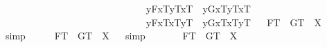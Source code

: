 \begin{isabellebody}
\ \ \ \ \ \ \ \ \ \ \ \ \ \ \ \ \ \ \ \ \ \ \ \ \ \ \ \ \ \isactrlbold {\isasymand}\ {\isacharparenleft}\isactrlbold {\isasymlambda}y{\isachardot}{\isasymlparr}F{}{\isacharcomma}x{}\isactrlsup T{\isacharcomma}y\isactrlsup T{\isacharcomma}x{}\isactrlsup T{\isasymrparr}{\isacharparenright}\ \isactrlbold {\isacharequal}\ {\isacharparenleft}\isactrlbold {\isasymlambda}y{\isachardot}{\isasymlparr}G{}{\isacharcomma}x{}\isactrlsup T{\isacharcomma}y\isactrlsup T{\isacharcomma}x{}\isactrlsup T{\isasymrparr}{\isacharparenright}\isanewline
\ \ \ \ \ \ \ \ \ \ \ \ \ \ \ \ \ \ \ \ \ \ \ \ \ \ \ \ \ \isactrlbold {\isasymand}\ {\isacharparenleft}\isactrlbold {\isasymlambda}y{\isachardot}{\isasymlparr}F{}{\isacharcomma}x{}\isactrlsup T{\isacharcomma}x{}\isactrlsup T{\isacharcomma}y\isactrlsup T{\isasymrparr}{\isacharparenright}\ \isactrlbold {\isacharequal}\ {\isacharparenleft}\isactrlbold {\isasymlambda}y{\isachardot}{\isasymlparr}G{}{\isacharcomma}x{}\isactrlsup T{\isacharcomma}x{}\isactrlsup T{\isacharcomma}y\isactrlsup T{\isasymrparr}{\isacharparenright}{\isacharparenright}{\isachardoublequoteclose}\isanewline
\isanewline
\ \isamarkupfalse%
\ {\isachardoublequoteopen}F{}\isactrlsup T\ \isactrlbold {\isacharequal}\ G{}\isactrlsup T\ {\isacharequal}\ X{\isachardoublequoteclose}%
\isadelimproof
\ %
\endisadelimproof
%
\isatagproof
{}\isamarkupfalse%
\ simp\ \isamarkupfalse%
\ %
%
\endisatagproof
{\isafoldproof}%
%
\isadelimproof
%
\endisadelimproof
\isanewline
\ \isamarkupfalse%
\ {\isachardoublequoteopen}F{}\isactrlsup T\ \isactrlbold {\isacharequal}\ G{}\isactrlsup T\ {\isacharequal}\ X{\isachardoublequoteclose}%
\isadelimproof
\ %
\endisadelimproof
%
\isatagproof
{}\isamarkupfalse%
\ simp\ \isamarkupfalse%
\ %
%
\endisatagproof
{\isafoldproof}%
%
\isadelimproof
%
\endisadelimproof
\ \isanewline
\ \isamarkupfalse%
\ {\isachardoublequoteopen}F{}\isactrlsup T\ \isactrlbold {\isacharequal}\ G{}\isactrlsup T\ {\isacharequal}\ X{\isachardoublequoteclose}%

\end{isabellebody}
